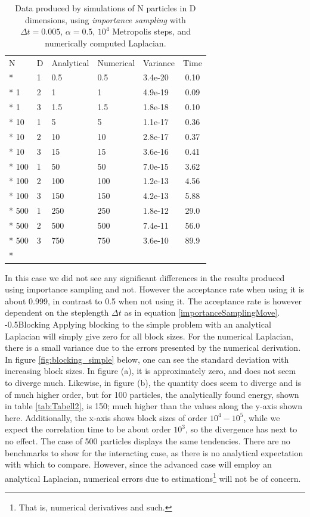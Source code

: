 \documentclass[english, a4paper]{article}
\makeatletter
\renewcommand{\subsubsection}{\@startsection{subsubsection}{3}{0pt}%
{-\baselineskip}{0.5\baselineskip}{\bf\large}}
\makeatother
\begin{document}
\begin{table}[H]
	\caption{Data produced by simulations of N particles in D dimensions, using \emph{importance sampling} with $\Delta t=0.005$, $\alpha=0.5$, $10^4$ Metropolis steps, and numerically computed Laplacian. }
	\begin{tabularx}{\textwidth}{X X X X X c}
		\toprule
    N &D &Analytical &Numerical &Variance &Time \\*
    \hline
    1& 1& 0.5& 0.5& 3.4e-20& 0.10\\*
    1& 2& 1& 1& 4.9e-19& 0.09\\*
    1& 3& 1.5& 1.5& 1.8e-18& 0.10\\*
    10& 1& 5& 5& 1.1e-17& 0.36\\*
    10& 2& 10& 10& 2.8e-17& 0.37\\*
    10& 3& 15& 15& 3.6e-16& 0.41\\*
    100& 1& 50& 50& 7.0e-15& 3.62\\*
    100& 2& 100& 100& 1.2e-13& 4.56\\*
    100& 3& 150& 150& 4.2e-13& 5.88\\*
    500& 1& 250& 250& 1.8e-12& 29.0\\*
    500& 2& 500& 500& 7.4e-11& 56.0\\*
    500& 3& 750& 750& 3.6e-10& 89.9\\*
    \bottomrule
\end{tabularx}
\label{tab:Tabell3}
\end{table}

In this case we did not see any significant differences in the results produced using importance sampling and not. However the acceptance rate when using it is about 0.999, in contrast to 0.5 when not using it. The acceptance rate is however dependent on the steplength $\Delta t$ as in equation \eqref{importanceSamplingMove}.
\subsubsection{Blocking}
Applying blocking to the simple problem with an analytical Laplacian will simply give zero for all block sizes. For the numerical Laplacian, there is a small variance due to the errors presented by the numerical derivation. In figure \ref{fig:blocking_simple} below, one can see the standard deviation with increasing block sizes. In figure (a), it is approximately zero, and does not seem to diverge much. Likewise, in figure (b), the quantity does seem to diverge and is of much higher order, but for 100 particles, the analytically found energy, shown in table \ref{tab:Tabell2}, is 150; much higher than the values along the y-axis shown here. Additionally, the x-axis shows block sizes of order $10^4-10^5$, while we expect the correlation time to be about order $10^3$, so the divergence has next to no effect. The case of 500 particles displays the same tendencies. There are no benchmarks to show for the interacting case, as there is no analytical expectation with which to compare. However, since the advanced case will employ an analytical Laplacian, numerical errors due to estimations\footnote{That is, numerical derivatives and such.} will not be of concern.
\end{document}
